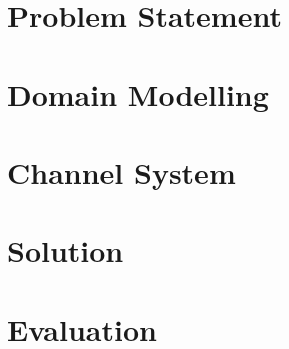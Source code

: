 \section {Problem Statement}
\label{sec:problem}


\section{Domain Modelling}
\label{sec:modelling}


\section{Channel System}
\label{sec:modelling}


\section{Solution}
\label{sec:solution}



%


\section{Evaluation}%
\label{sec:validation}



%
